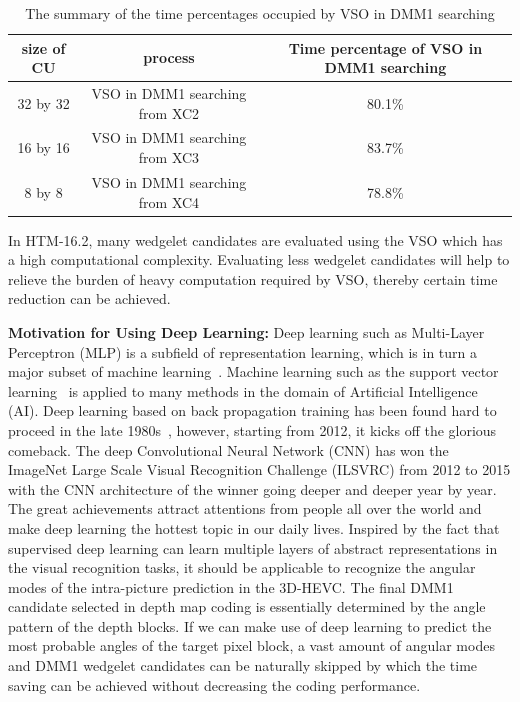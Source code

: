 \begin{table}[t]
    \caption{The summary of the time percentages occupied by VSO in DMM1 searching}
    \bigskip
    \label{tab:vso-in-dmm1-searching-time-percent-summary}
    \centering
    \begin{tabular}{c c c}
        \hline
        size of CU & process & Time percentage of VSO in DMM1 searching\\
        \hline
        32 by 32  & VSO in DMM1 searching from XC2 & 80.1\% \\
        16 by 16 & VSO in DMM1 searching from XC3 & 83.7\% \\
        8 by 8 & VSO in DMM1 searching from XC4 & 78.8\% \\
        \hline
    \end{tabular}
\end{table}
In HTM-16.2, many wedgelet candidates are evaluated using the VSO which
has a high computational complexity.
Evaluating less wedgelet candidates will help to relieve
the burden of heavy computation required by VSO, thereby certain
time reduction can be achieved.

\textbf{Motivation for Using Deep Learning:} Deep learning such as
Multi-Layer Perceptron (MLP) is a subfield of representation learning, which
is in turn a major subset of machine learning~\parencite{RN158}.
Machine learning such as the support vector learning~\parencite{RN198}
is applied to many methods in the domain of Artificial Intelligence (AI).
Deep learning based on back propagation training has been found hard to proceed
in the late 1980s~\parencite{RN199}, however, starting from 2012, it kicks off the
glorious comeback.
The deep Convolutional Neural Network (CNN) has won the ImageNet
Large Scale Visual Recognition Challenge (ILSVRC)
from 2012 to 2015 with the CNN architecture of the winner going deeper
and deeper year by year.
The great achievements attract attentions from people all over the world and
make deep learning the hottest topic in our daily lives.
Inspired by the fact that supervised deep learning can learn multiple layers of
abstract representations in the visual recognition tasks, it should
be applicable to recognize the angular modes of the intra-picture
prediction in the 3D-HEVC.
The final DMM1 candidate selected in depth map coding
is essentially determined by the angle pattern of the depth blocks.
If we can make use of deep learning to predict the most probable angles of the
target pixel block, a vast amount of angular modes and DMM1
wedgelet candidates can be naturally skipped by which the time saving can be
achieved without decreasing the coding performance.

